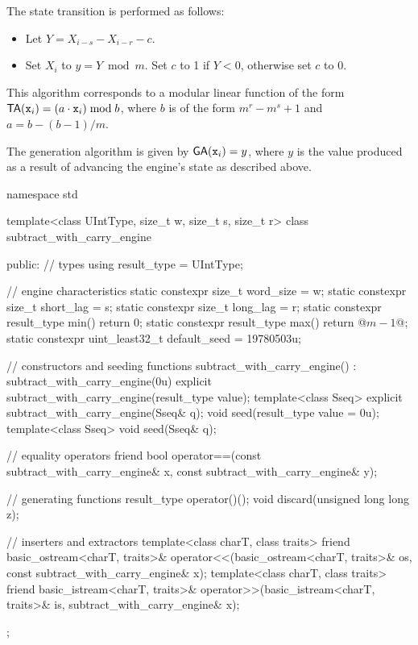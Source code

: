 \pnum
The state transition
is performed as follows:
\begin{itemize}
 \item
   Let $Y = X_{i-s} - X_{i-r} - c$.
 \item
   Set $X_i$ to $y = Y \bmod m$.
   Set $c$ to 1 if $Y < 0$,
   otherwise set $c$ to 0.
\end{itemize}
\begin{note}
 This algorithm corresponds
 to a modular linear function
 of the form
 $\mathsf{TA}(\texttt{\protect x}_{i}) = (a \cdot \texttt{\protect x}_{i}) \bmod b$,
 where $b$ is of the form
 $m^r - m^s + 1$
 and $a = b - (b - 1) / m$.
\end{note}

\pnum
The generation algorithm
is given by $\mathsf{GA}(\texttt{\protect x}_{i}) = y$,
where $y$ is the value produced as a result
of advancing the engine's state as described above.

%
%
\begin{codeblock}
namespace std {
  template<class UIntType, size_t w, size_t s, size_t r>
  class subtract_with_carry_engine {
  public:
    // types
    using result_type = UIntType;

    // engine characteristics
    static constexpr size_t word_size = w;
    static constexpr size_t short_lag = s;
    static constexpr size_t long_lag = r;
    static constexpr result_type min() { return 0; }
    static constexpr result_type max() { return @$m - 1$@; }
    static constexpr uint_least32_t default_seed = 19780503u;

    // constructors and seeding functions
    subtract_with_carry_engine() : subtract_with_carry_engine(0u) {}
    explicit subtract_with_carry_engine(result_type value);
    template<class Sseq> explicit subtract_with_carry_engine(Sseq& q);
    void seed(result_type value = 0u);
    template<class Sseq> void seed(Sseq& q);

    // equality operators
    friend bool operator==(const subtract_with_carry_engine& x,
                           const subtract_with_carry_engine& y);

    // generating functions
    result_type operator()();
    void discard(unsigned long long z);

    // inserters and extractors
    template<class charT, class traits>
      friend basic_ostream<charT, traits>&
        operator<<(basic_ostream<charT, traits>& os, const subtract_with_carry_engine& x);
    template<class charT, class traits>
      friend basic_istream<charT, traits>&
        operator>>(basic_istream<charT, traits>& is, subtract_with_carry_engine& x);
  };
}
\end{codeblock}

